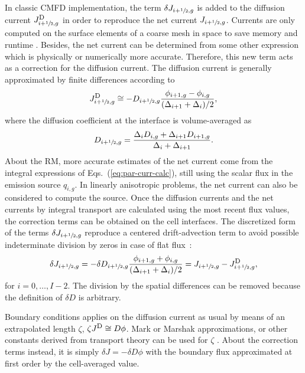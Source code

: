 \documentclass[letterpaper]{physor2020}
\newcommand{\eqs}[1]{Eqs.~(\ref{#1})}
\newcommand{\jD}{\ensuremath{J^{\textrm{\scriptsize{D}}}}}
\newcommand{\hzi}{\ensuremath{\sfrac{1}{2}}}
\begin{document}
In classic CMFD implementation, the term $\delta J_{i+\hzi,g}$ is added to the diffusion current $\jD_{i+\hzi,g}$ in order to reproduce the net current $J_{i+\hzi,g}$. Currents are only computed on the surface elements of a coarse mesh in space to save memory and runtime \cite{Smith-1983}. Besides, the net current can be determined from some other expression which is physically or numerically more accurate. Therefore, this new term acts as a correction for the diffusion current. The diffusion current is generally approximated by finite differences according to
\begin{equation}
  \label{eq:JD}
  \jD_{i+\hzi,g} \cong - D_{i+\hzi,g}
    \frac{\phi_{i+1,g} - \phi_{i,g}}{(\Delta_{i+1} + \Delta_i)/2},
\end{equation}
where the diffusion coefficient at the interface is volume-averaged as
\begin{equation}
  \label{eq:Ds}
  D_{i+\hzi,g} = \frac{\Delta_i D_{i,g} + \Delta_{i+1} D_{i+1,g}}
{\Delta_i + \Delta_{i+1}}.
\end{equation}
%
About the RM, more accurate estimates of the net current come from the integral expressions of \eqs{eq:par-curr-calc}, still using the scalar flux in the emission source $q_{i,g}$. In linearly anisotropic problems, the net current can also be considered to compute the source. Once the diffusion currents and the net currents by integral transport are calculated using the most recent flux values, the correction terms can be obtained on the cell interfaces. The discretized form of the terms $\delta J_{i+\hzi,g}$ reproduce a centered drift-advection term to avoid possible indeterminate division by zeros in case of flat flux~\cite{Smith-1983,Tomatis-2011}:
\begin{equation}
  \label{eq:dJ}
  \delta J_{i+\hzi,g} = -\delta D_{i+\hzi,g}
    \frac{\phi_{i+1,g} + \phi_{i,g}}{(\Delta_{i+1} + \Delta_i)/2} =
  J_{i+\hzi,g} - \jD_{i+\hzi,g},
\end{equation}
for $i = 0, \ldots, I-2$. The division by the spatial differences can be removed because the definition of $\delta D$ is arbitrary.

Boundary conditions applies on the diffusion current as usual by means of an extrapolated length $\zeta$, $\zeta \jD \cong D \phi$. Mark or Marshak approximations, or other constants derived from transport theory can be used for $\zeta$ \cite{meghreblian1960reactor}. About the correction terms instead, it is simply $\delta J = -\delta D \phi$ with the boundary flux approximated at first order by the cell-averaged value.
\end{document}
